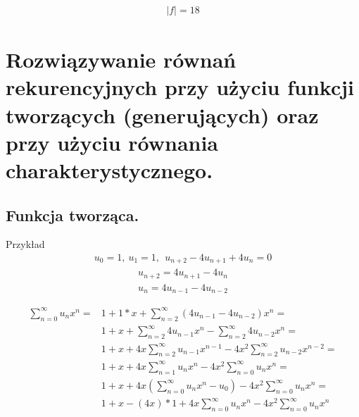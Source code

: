 \documentclass[main.tex]{subfiles}
\begin{document}
    \begin{align*}
        |f| = 18
    \end{align*}



    \newpage

    \section{Rozwiązywanie równań rekurencyjnych przy użyciu funkcji tworzących (generujących) oraz przy użyciu równania charakterystycznego.}

    \subsection{Funkcja tworząca.}

    Przykład
    \begin{align*}
        u_0 = 1, ~ u_1 = 1, ~~ u_{n+2} - 4 u_{n+1} + 4 u_n = 0
    \end{align*}
    \begin{align*}
        u_{n+2} = 4 u_{n+1} - 4 u_n
    \end{align*}
    \begin{align*}
        u_n = 4 u_{n-1} - 4 u_{n-2}
    \end{align*}

    \begin{align*}
        \sum_{n=0}^{\infty} u_n x^n = &1 + 1*x + \sum_{n=2}^{\infty} (4 u_{n-1} - 4 u_{n-2})x^n =\\
        &1 + x + \sum_{n=2}^{\infty} 4 u_{n-1} x^n - \sum_{n=2}^{\infty} 4 u_{n-2} x^n =\\
        &1 + x + 4x \sum_{n=2}^{\infty} u_{n-1} x^{n-1} - 4x^2 \sum_{n=2}^{\infty} u_{n-2} x^{n-2} =\\
        &1 + x + 4x \sum_{n=1}^{\infty} u_n x^n - 4x^2 \sum_{n=0}^{\infty} u_n x^n =\\
        &1 + x + 4x (\sum_{n=0}^{\infty} u_n x^n - u_0) - 4x^2 \sum_{n=0}^{\infty} u_n x^n =\\
        &1 + x - (4x)*1 + 4x \sum_{n=0}^{\infty} u_n x^n - 4x^2 \sum_{n=0}^{\infty} u_n x^n
    \end{align*}
\end{document}
